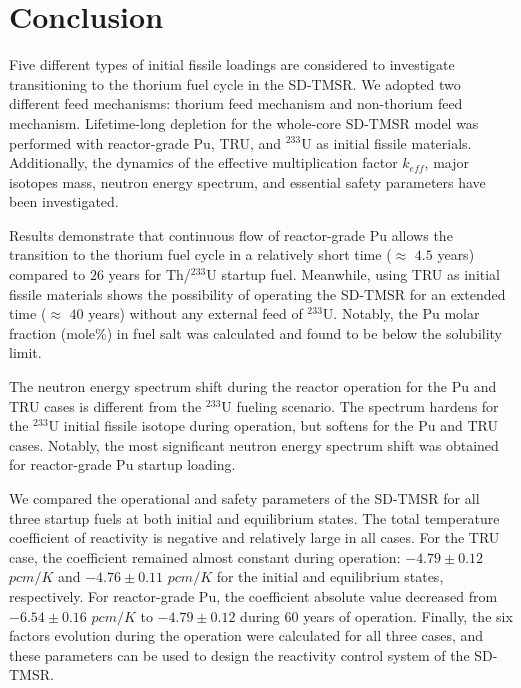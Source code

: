 \section{Conclusion} \label{Conclusion}

Five different types of initial fissile loadings are considered to investigate 
transitioning to the thorium fuel cycle in the SD-TMSR. We adopted two 
different feed mechanisms: thorium feed mechanism and non-thorium feed 
mechanism. Lifetime-long depletion for the whole-core SD-TMSR model was 
performed with reactor-grade Pu, TRU, and $^{233}$U as initial fissile 
materials. Additionally, the dynamics of the effective multiplication factor 
$k_{eff}$, major isotopes mass, neutron energy spectrum, and essential safety 
parameters have been investigated. 

Results demonstrate that continuous flow of reactor-grade Pu allows the 
transition to the thorium fuel cycle in a relatively short time ($\approx$ 
$4.5$ years) compared to $26$ years for Th/$^{233}$U startup fuel. 
Meanwhile, using \gls{TRU} as initial fissile materials shows the possibility 
of operating the SD-TMSR for an extended time ($\approx$ $40$ years) 
without any external feed of $^{233}$U. Notably, the Pu molar fraction (mole\%) in 
fuel salt was calculated and found to be below the solubility limit. 

The neutron energy spectrum shift during the reactor operation 
for the Pu and TRU cases is different from the $^{233}$U fueling scenario. 
The spectrum hardens for the $^{233}$U initial fissile isotope during 
operation, but softens for the Pu and TRU cases. Notably, the most 
significant neutron energy spectrum shift was obtained for reactor-grade Pu 
startup loading. 

We compared the operational and safety parameters of the \gls{SD-TMSR} for all 
three startup fuels at both initial and equilibrium states. The total 
temperature coefficient of reactivity is negative and relatively large in all 
cases. For the TRU case, the coefficient remained almost constant during 
operation: $-4.79\pm0.12$ $pcm/K$ and $-4.76\pm0.11$ $pcm/K$ for the initial 
and equilibrium states, respectively. For reactor-grade Pu, the coefficient 
absolute value decreased from $-6.54\pm0.16$ $pcm/K$ to $-4.79\pm0.12$ during 
60 years of operation. Finally, the six factors evolution during the operation 
were calculated for all three cases, and these parameters can be used to 
design the reactivity control system of the \gls{SD-TMSR}.

